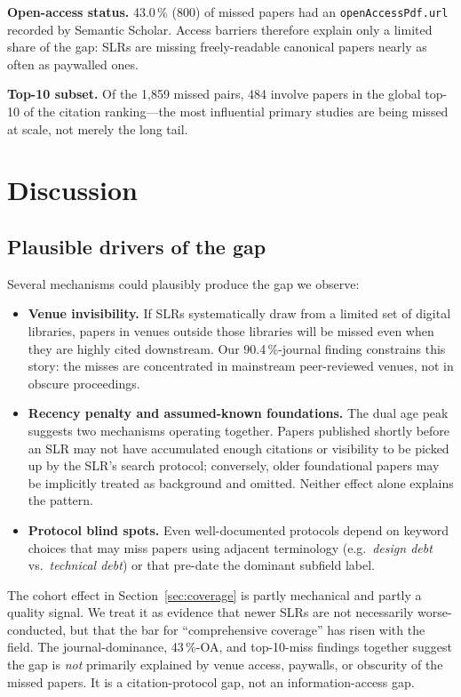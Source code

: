 \documentclass[conference]{IEEEtran}
\begin{document}
\textbf{Open-access status.} 43.0\,\% (800) of missed papers had an
\texttt{openAccessPdf.url} recorded by Semantic Scholar. Access barriers
therefore explain only a limited share of the gap: SLRs are missing
freely-readable canonical papers nearly as often as paywalled ones.

\textbf{Top-10 subset.} Of the 1{,}859 missed pairs, 484 involve papers in
the global top-10 of the citation ranking---the most influential primary
studies are being missed at scale, not merely the long tail.

\section{Discussion}

\subsection{Plausible drivers of the gap}

Several mechanisms could plausibly produce the gap we observe:

\begin{itemize}
  \item \textbf{Venue invisibility.} If SLRs systematically draw from a
        limited set of digital libraries, papers in venues outside those
        libraries will be missed even when they are highly cited
        downstream. Our 90.4\,\%-journal finding constrains this story: the
        misses are concentrated in mainstream peer-reviewed venues, not in
        obscure proceedings.
  \item \textbf{Recency penalty and assumed-known foundations.} The dual
        age peak suggests two mechanisms operating together. Papers
        published shortly before an SLR may not have accumulated enough
        citations or visibility to be picked up by the SLR's search
        protocol; conversely, older foundational papers may be implicitly
        treated as background and omitted. Neither effect alone explains
        the pattern.
  \item \textbf{Protocol blind spots.} Even well-documented protocols
        depend on keyword choices that may miss papers using adjacent
        terminology (e.g.\ \emph{design debt} vs.\ \emph{technical debt})
        or that pre-date the dominant subfield label.
\end{itemize}

The cohort effect in Section~\ref{sec:coverage} is partly mechanical and
partly a quality signal. We treat it as evidence that newer SLRs are not
necessarily worse-conducted, but that the bar for ``comprehensive coverage''
has risen with the field. The journal-dominance, 43\,\%-OA, and top-10-miss
findings together suggest the gap is \emph{not} primarily explained by
venue access, paywalls, or obscurity of the missed papers. It is a
citation-protocol gap, not an information-access gap.
\end{document}

